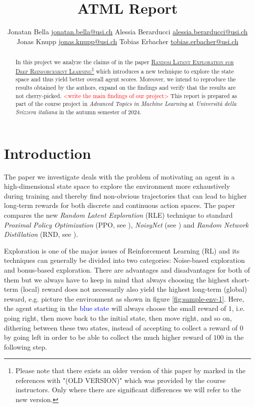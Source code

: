\documentclass[10pt]{article} %
\title{ATML Report}
\author{%
  \name Jonatan Bella \email \href{mailto:jonatan.bella@usi.ch}{jonatan.bella@usi.ch}
  \AND
  \name Alessia Berarducci \email \href{mailto:alessia.berarducci@usi.ch}{alessia.berarducci@usi.ch}
  \AND
  \name Jonas Knupp \email \href{mailto:jonas.knupp@usi.ch}{jonas.knupp@usi.ch}
  \AND
  \name Tobias Erbacher \email \href{mailto:tobias.erbacher@usi.ch}{tobias.erbacher@usi.ch}
}
\begin{document}
\maketitle

\begin{abstract}
In this project we analyze the claims of \cite{rle-paper} in the paper \href{https://arxiv.org/abs/2407.13755}{\textsc{Random Latent Exploration for Deep Reinforcement Learning}}\footnote{Please note that there exists an older version of this paper by \cite{rle-paper-old} marked in the references with "(OLD VERSION)" which was provided by the course instructors. Only where there are significant differences we will refer to the new version.} which introduces a new technique to explore the state space and thus yield better overall agent scores. Moreover, we intend to reproduce the results obtained by the authors, expand on the findings and verify that the results are not cherry-picked. \textcolor{red}{<write the main findings of our project>} This report is prepared as part of the course project in \textit{Advanced Topics in Machine Learning} at \textit{Università della Svizzera italiana} in the autumn semester of 2024.
\end{abstract}


\section{Introduction}
\noindent The paper we investigate deals with the problem of motivating an agent in a high-dimensional state space to explore the environment more exhaustively during training and thereby find non-obvious trajectories that can lead to higher long-term rewards for both discrete and continuous action spaces. The paper compares the new \textit{Random Latent Exploration} (RLE) technique to standard \textit{Proximal Policy Optimization} (PPO, see \cite{ppo-paper}), \textit{NoisyNet} (see \cite{noisynet-paper}) and \textit{Random Network Distillation} (RND, see \cite{rnd-paper}).

\noindent Exploration is one of the major issues of Reinforcement Learning (RL) and its techniques can generally be divided into two categories: Noise-based exploration and bonus-based exploration. There are advantages and disadvantages for both of them but we always have to keep in mind that always choosing the highest short-term (local) reward does not necessarily also yield the highest long-term (global) reward, e.g. picture the environment as shown in figure \ref{fig:sample-env-1}. Here, the agent starting in the \textcolor{blue}{blue state} will always choose the small reward of $1$, i.e. going right, then move back to the initial state, then move right, and so on, dithering between these two states, instead of accepting to collect a reward of $0$ by going left in order to be able to collect the much higher reward of $100$ in the following step.
\end{document}
